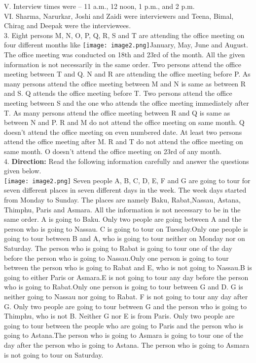 \documentclass[
]{article}
\begin{document}
V. Interview times were – 11 a.m., 12 noon, 1 p.m., and 2 p.m.\\

VI. Sharma, Narurkar, Joshi and Zaidi were interviewers and Teena, Bimal, Chirag and Deepak were the interviewees.\\

3. Eight persons M, N, O, P, Q, R, S and T are attending the office meeting on four different
months like \texttt{[image: image2.png]}January, May, June and August. The office meeting was conducted on 18th and
23rd of the month. All the given information is not necessarily in the same order. Two
persons attend the office meeting between T and Q. N and R are attending the office
meeting before P. As many persons attend the office meeting between M and N is same as
between R and S. Q attends the office meeting before T. Two persons attend the office
meeting between S and the one who attends the office meeting immediately after T. As
many persons attend the office meeting between R and Q is same as between N and P. R
and M do not attend the office meeting on same month. Q doesn’t attend the office meeting
on even numbered date. At least two persons attend the office meeting after M. R and T do
not attend the office meeting on same month. O doesn’t attend the office meeting on 23rd of
any month.\\

4. \textbf{Direction:} Read the following information carefully and answer the questions given below.\\
\texttt{[image: image2.png]}
Seven people A, B, C, D, E, F and G are going to tour for seven different places in seven
different days in the week. The week days started from Monday to Sunday. The places are
namely Baku, Rabat,Nassau, Astana, Thimphu, Paris and Asmara. All the information is not
necessary to be in the same order.
A is going to Baku. Only two people are going between A and the person who is going to
Nassau. C is going to tour on Tuesday.Only one people is going to tour between B and A,
who is going to tour neither on Monday nor on Saturday. The person who is going to Rabat
is going to tour one of the day before the person who is going to Nassau.Only one person is
going to tour between the person who is going to Rabat and E, who is not going to Nassau.B
is going to either Paris or Asmara.E is not going to tour any day before the person who is
going to Rabat.Only one person is going to tour between G and D. G is neither going to
Nassau nor going to Rabat. F is not going to tour any day after G. Only two people are
going to tour between G and the person who is going to Thimphu, who is not B. Neither G
nor E is from Paris. Only two people are going to tour between the people who are going to
Paris and the person who is going to Astana.The person who is going to Asmara is going to
tour one of the day after the person who is going to Astana. The person who is going to
Asmara is not going to tour on Saturday.\\
\end{document}

